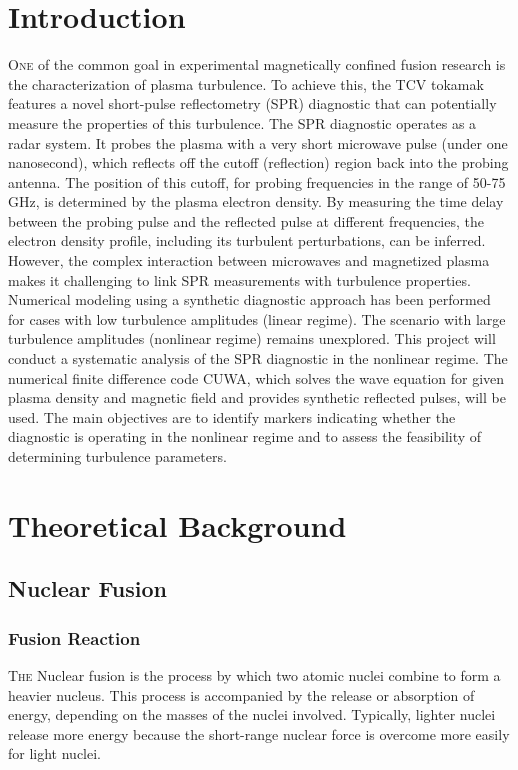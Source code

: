 \documentclass[11pt,a4paper,openany]{report}
\begin{document}
\begin{multicols}{2}
    \chapter*{Introduction}
    \lettrine[loversize=.30,findent=.21em,nindent=2.5pt]{\color{black} O}{ne} of the common goal in experimental magnetically confined fusion research is the characterization of plasma turbulence. To achieve this, the TCV tokamak features a novel short-pulse reflectometry (SPR) diagnostic that can potentially measure the properties of this turbulence.
    The SPR diagnostic operates as a radar system. It probes the plasma with a very short microwave pulse (under one nanosecond), which reflects off the cutoff (reflection) region back into the probing antenna. The position of this cutoff, for probing frequencies in the range of 50-75 GHz, is determined by the plasma electron density. By measuring the time delay between the probing pulse and the reflected pulse at different frequencies, the electron density profile, including its turbulent perturbations, can be inferred.
    However, the complex interaction between microwaves and magnetized plasma makes it challenging to link SPR measurements with turbulence properties. Numerical modeling using a synthetic diagnostic approach has been performed for cases with low turbulence amplitudes (linear regime). The scenario with large turbulence amplitudes (nonlinear regime) remains unexplored.
    This project will conduct a systematic analysis of the SPR diagnostic in the nonlinear regime. The numerical finite difference code CUWA, which solves the wave equation for given plasma density and magnetic field and provides synthetic reflected pulses, will be used. The main objectives are to identify markers indicating whether the diagnostic is operating in the nonlinear regime and to assess the feasibility of determining turbulence parameters.
    \chapter{Theoretical Background}

    \section{Nuclear Fusion}
    \subsection{Fusion Reaction}
    \lettrine[lines=2, lhang=.3, nindent=0pt]{\color{black} T}{he} Nuclear fusion is the process by which two atomic nuclei combine to form a heavier nucleus. This process is accompanied by the release or absorption of energy, depending on the masses of the nuclei involved. Typically, lighter nuclei release more energy because the short-range nuclear force is overcome more easily for light nuclei.


\end{multicols}
\end{document}
